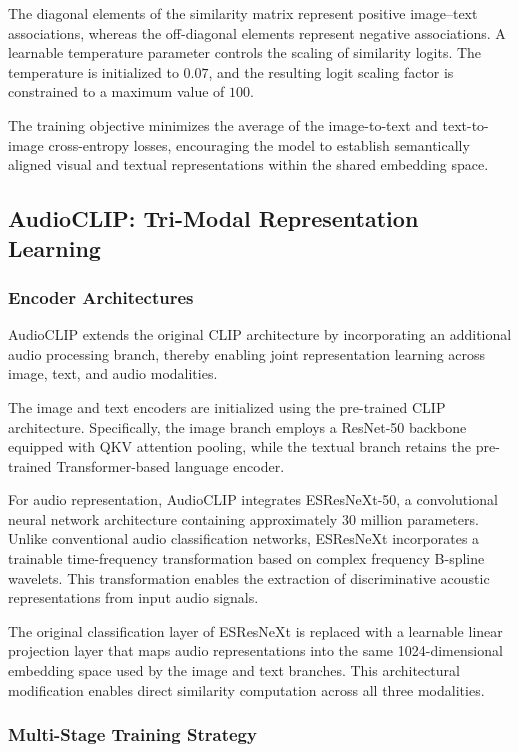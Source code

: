 \documentclass[pdflatex,sn-mathphys-num]{sn-jnl}%
\theoremstyle{thmstyleone}%
\theoremstyle{thmstyletwo}%
\theoremstyle{thmstylethree}%
\begin{document}
The diagonal elements of the similarity matrix represent positive image--text associations, whereas the off-diagonal elements represent negative associations. A learnable temperature parameter controls the scaling of similarity logits. The temperature is initialized to $0.07$, and the resulting logit scaling factor is constrained to a maximum value of $100$.

The training objective minimizes the average of the image-to-text and text-to-image cross-entropy losses, encouraging the model to establish semantically aligned visual and textual representations within the shared embedding space.

\subsection{AudioCLIP: Tri-Modal Representation Learning}

\subsubsection{Encoder Architectures}

AudioCLIP extends the original CLIP architecture by incorporating an additional audio processing branch, thereby enabling joint representation learning across image, text, and audio modalities.

The image and text encoders are initialized using the pre-trained CLIP architecture. Specifically, the image branch employs a ResNet-50 backbone equipped with QKV attention pooling, while the textual branch retains the pre-trained Transformer-based language encoder.

For audio representation, AudioCLIP integrates ESResNeXt-50, a convolutional neural network architecture containing approximately 30 million parameters. Unlike conventional audio classification networks, ESResNeXt incorporates a trainable time-frequency transformation based on complex frequency B-spline wavelets. This transformation enables the extraction of discriminative acoustic representations from input audio signals.

The original classification layer of ESResNeXt is replaced with a learnable linear projection layer that maps audio representations into the same 1024-dimensional embedding space used by the image and text branches. This architectural modification enables direct similarity computation across all three modalities.

\subsubsection{Multi-Stage Training Strategy}
\end{document}
